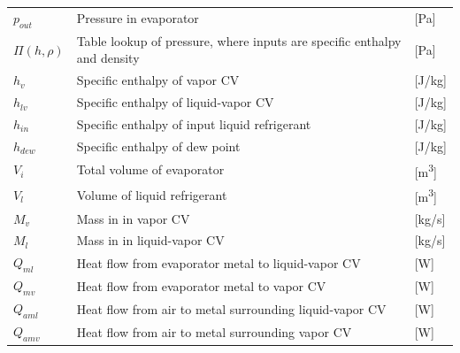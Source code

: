 \begin{center}
	\begin{tabular}{l p{10cm} l}
		$ p_{out} 	$     & Pressure in evaporator                                                  & [\si{Pa}]                         \\
		$\Pi(h,\rho) $   & Table lookup of pressure, where inputs are specific enthalpy and density & [\si{Pa}]                         \\
		$h_{v} $         & Specific enthalpy of vapor CV                                            & [\si{J}/\si{kg}]                  \\
		$h_{lv} $         & Specific enthalpy of liquid-vapor CV                                     & [\si{J}/\si{kg}]                  \\
		$h_{in} $        & Specific enthalpy of input liquid refrigerant                            & [\si{J}/\si{kg}]                  \\
		$h_{dew}$        & Specific enthalpy of dew point                                           & [\si{J}/\si{kg}]                  \\
		$V_{i} $         & Total volume of evaporator                                               & [\si{m^3}]                        \\
		$V_{l} $         & Volume of liquid refrigerant                                             & [\si{m^3}]                        \\
		$M_{v}$          & Mass in	in vapor CV                                                     & [\si{kg}/\si{s}]                  \\
		$M_{l}$          & Mass in	in liquid-vapor CV                                              & [\si{kg}/\si{s}]                  \\
		$Q_{ml}$         & Heat flow from evaporator metal to liquid-vapor CV                       & [\si{W}]                          \\
		$Q_{mv}$         & Heat flow from evaporator metal to vapor CV                              & [\si{W}]                          \\
		$Q_{aml}$        & Heat flow from air to metal surrounding liquid-vapor CV                  & [\si{W}]                          \\
		$Q_{amv}$        & Heat flow from air to metal surrounding vapor CV                         & [\si{W}]                          \\

\end{tabular}
\end{center}
